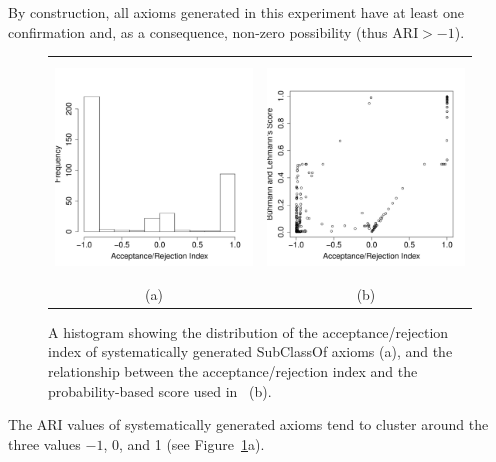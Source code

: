 \documentclass{llncs}
\begin{document}
By construction, all axioms generated in this experiment have at least one confirmation
and, as a consequence, non-zero possibility (thus $\mathrm{ARI} > -1$).

\begin{figure}[t]
\begin{center}
  \begin{tabular}{cc}
    \includegraphics[height=2.25in]{ARI-hist} &
    \includegraphics[height=2.25in]{ARI-BLS} \\
    (a) & (b)
  \end{tabular}
\end{center}
\caption{A histogram showing the distribution of the acceptance/rejection index
  of systematically generated \textsf{SubClassOf} axioms (a),
  and the relationship between the acceptance/rejection index and the probability-based
  score used in~\cite{BuehmannLehmann2012} (b).}
\label{fig:ARI}
\end{figure}

The ARI values of systematically generated axioms tend to cluster
around the three values $-1$, 0, and 1 (see Figure~\ref{fig:ARI}a).
\end{document}
